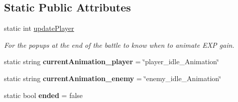 \subsection*{Static Public Attributes}
\begin{DoxyCompactItemize}
\item 
\mbox{\label{class_gameplay_acd7f7caba8d780232371c187cdf8fcc8}} 
static int \mbox{\hyperlink{class_gameplay_acd7f7caba8d780232371c187cdf8fcc8}{update\+Player}}
\begin{DoxyCompactList}\small\item\em For the popups at the end of the battle to know when to animate E\+XP gain. \end{DoxyCompactList}\item 
\mbox{\label{class_gameplay_a4c1b8e45bd5eadbb4a9d876be085ffe6}} 
static string {\bfseries current\+Animation\+\_\+player} = \char`\"{}player\+\_\+idle\+\_\+\+Animation\char`\"{}
\item 
\mbox{\label{class_gameplay_ab7decfcd8cb7caa5262c05a80d56b564}} 
static string {\bfseries current\+Animation\+\_\+enemy} = \char`\"{}enemy\+\_\+idle\+\_\+\+Animation\char`\"{}
\item 
\mbox{\label{class_gameplay_a2a5861c6013001df52b09f53f9194e87}} 
static bool {\bfseries ended} = false
\end{DoxyCompactItemize}
